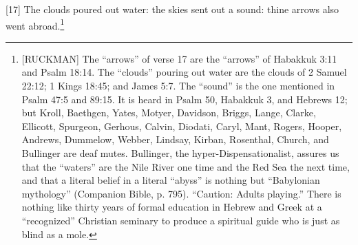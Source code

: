 [17] \textcolor[rgb]{0.00,0.00,1.00}{The clouds poured out water: the skies sent out a sound: thine arrows also went abroad.}\footnote{[RUCKMAN] The “arrows” of verse 17 are the “arrows” of Habakkuk 3:11 and Psalm 18:14. The “clouds” pouring out water are the clouds of 2 Samuel 22:12; 1 Kings 18:45; and James 5:7. The “sound” is the one mentioned in Psalm 47:5 and 89:15. It is heard in Psalm 50, Habakkuk 3, and Hebrews 12; but Kroll, Baethgen, Yates, Motyer, Davidson, Briggs, Lange, Clarke, Ellicott, Spurgeon, Gerhous, Calvin, Diodati, Caryl, Mant, Rogers, Hooper, Andrews, Dummelow, Webber, Lindsay, Kirban, Rosenthal, Church, and Bullinger are deaf mutes. Bullinger, the hyper-Dispensationalist, assures us that the “waters” are the Nile River one time and the Red Sea the next time, and that a literal belief in a literal “abyss” is nothing but “Babylonian mythology” (Companion Bible, p. 795). “Caution: Adults playing.” There is nothing like thirty years of formal education in Hebrew and Greek at a “recognized” Christian seminary to produce a spiritual guide who is just as blind as a mole.\cite{Ruckman1992Psalms}}
